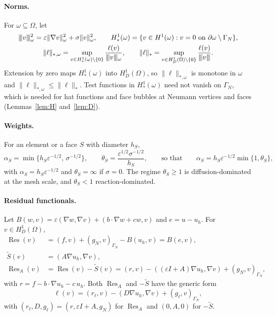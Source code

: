 \documentclass[11pt]{article}
\newcommand{\tnorm}[1]{\lvert\kern-0.25ex\lvert\kern-0.25ex\lvert #1\rvert\kern-0.25ex\rvert\kern-0.25ex\rvert}
\newcommand{\eps}{\varepsilon}
\newcommand{\Res}{\operatorname{Res}}
\newcommand{\Stil}{\tilde S}
\theoremstyle{plain}
\theoremstyle{remark}
\numberwithin{equation}{section}
\begin{document}
\paragraph{Norms.} For $\omega\subseteq\Omega$, let
\begin{gather*}
  \tnorm{v}_\omega^2 = \eps\|\nabla v\|_\omega^2 + \sigma\|v\|_\omega^2,\qquad
  H^1_*(\omega)=\{v\in H^1(\omega):v=0\text{ on }\partial\omega\setminus\Gamma_N\},\\
  \|\ell\|_{*,\omega} = \sup_{v\in H^1_*(\omega)\setminus\{0\}}\frac{\ell(v)}{\tnorm{v}_\omega},
  \qquad
  \|\ell\|_{*} = \sup_{v\in H^1_D(\Omega)\setminus\{0\}}\frac{\ell(v)}{\tnorm{v}}.
\end{gather*}
Extension by zero maps $H^1_*(\omega)$ into $H^1_D(\Omega)$, so $\|\ell\|_{*,\omega}$ is monotone in
$\omega$ and $\|\ell\|_{*,\omega}\le\|\ell\|_*$. Test functions in $H^1_*(\omega)$ need not vanish on
$\Gamma_N$, which is needed for hat functions and face bubbles at Neumann vertices and faces
(Lemmas~\ref{lem:H} and~\ref{lem:D}).

\paragraph{Weights.} For an element or a face $S$ with diameter $h_S$,
\[
  \alpha_S = \min\{h_S\eps^{-1/2},\,\sigma^{-1/2}\},\qquad
  \theta_S = \frac{\eps^{1/2}\sigma^{-1/2}}{h_S},
  \qquad\text{so that}\qquad \alpha_S = h_S\eps^{-1/2}\min\{1,\theta_S\},
\]
with $\alpha_S=h_S\eps^{-1/2}$ and $\theta_S=\infty$ if $\sigma=0$. The regime $\theta_S\ge1$ is
diffusion-dominated at the mesh scale, and $\theta_S<1$ reaction-dominated.

\paragraph{Residual functionals.} Let
$B(w,v)=\eps(\nabla w,\nabla v)+(b\cdot\nabla w+cw,v)$ and $e=u-u_h$. For $v\in H^1_D(\Omega)$,
\begin{align*}
  \Res(v) &= (f,v)+(g_N,v)_{\Gamma_N}-B(u_h,v) = B(e,v),\\
  \Stil(v) &= (A\nabla u_h,\nabla v),\\
  \Res_A(v) &= \Res(v)-\Stil(v) = (r,v)-((\eps I+A)\nabla u_h,\nabla v)+(g_N,v)_{\Gamma_N},
\end{align*}
with $r = f-b\cdot\nabla u_h-c\,u_h$. Both $\Res_A$ and $-\Stil$ have the generic form
\begin{equation}\label{eq:generic}
  \ell(v) = (r_\ell,v)-(D\nabla u_h,\nabla v)+(g_\ell,v)_{\Gamma_N},
\end{equation}
with $(r_\ell,D,g_\ell)=(r,\eps I+A,g_N)$ for $\Res_A$ and $(0,A,0)$ for $-\Stil$.
\end{document}
